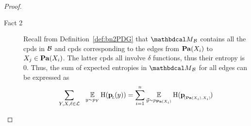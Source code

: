 \begin{proof}
\begin{description}
		  \item[Fact 2]
				   Recall from Definition~\ref{def:bn2PDG}
that $\PDGof{\cal B}$ contains all
the cpds in ${\cal B}$  and cpds corresponding to the edges from
$\Pa(X_i)$ to $X_j \in \Pa(X_i)$.  The latter cpds all involve $\delta$
functions, thus their entropy is 0.
Thus, the sum of
expected entropies in $\PDGof{\cal B}$ for all edges can be
expressed as 
\[\sum_{Y,X, \ell \in \cal L} ~~\E_{y \sim
					  p_Y}  \H (\bp ( y)) = \sum_{i=1}^n\E_{\vec y
					  \sim p_{\Pa(X_i)}}  \H (\bp[(\Pa(X_i),X_i)]) \]
			




\end{description}
\end{proof}
